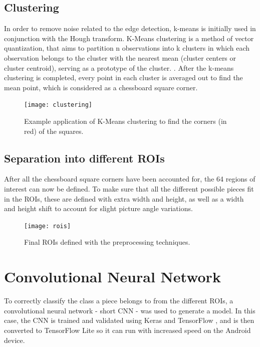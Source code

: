 \documentclass[10pt]{article}
\begin{document}
\subsection{Clustering}

In order to remove noise related to the edge detection, k-means is initially used in conjunction with the Hough transform. K-Means clustering is a method of vector quantization, that aims to partition n observations into k clusters in which each observation belongs to the cluster with the nearest mean (cluster centers or cluster centroid), serving as a prototype of the cluster.  . After the k-means clustering is completed, every point in each cluster is averaged out to find the mean point, which is considered as a chessboard square corner.

\begin{figure}[H]
	\centering
	\texttt{[image: clustering]}
	\caption{Example application of K-Means clustering to find the corners (in red) of the squares.}\label{fig:clustering}
\end{figure}

\subsection{Separation into different ROIs}

After all the chessboard square corners have been accounted for, the 64 regions of interest can now be defined. To make sure that all the different possible pieces fit in the ROIs, these are defined with extra width and height, as well as a width and height shift to account for slight picture angle variations.

\begin{figure}[H]
	\centering
	\texttt{[image: rois]}
	\caption{Final ROIs defined with the preprocessing techniques.}\label{fig:rois}
\end{figure}


\section{Convolutional Neural Network}\label{sec:4}

To correctly classify the class a piece belongs to from the different ROIs, a convolutional neural network \cite{1} - short CNN - was used to generate a model. In this case, the CNN is trained and validated using Keras and TensorFlow \cite{2}, and is then converted to TensorFlow Lite so it can run with increased speed on the Android device.
\end{document}
